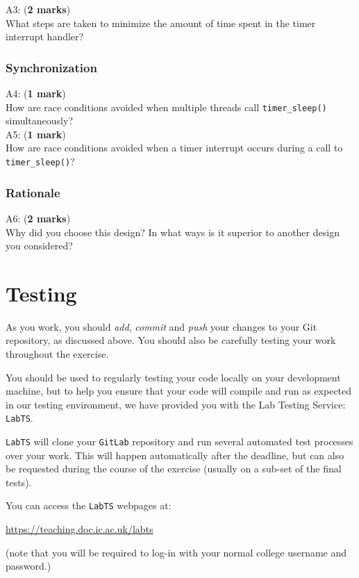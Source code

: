 \documentclass[a4paper,12pt]{article}
\newcommand{\shell}[1]{\lstinline!#1!}
\begin{document}
\noindent A3: ({\bf 2 marks}) \\
What steps are taken to minimize the amount of time spent in the timer interrupt handler?

\subsubsection*{Synchronization}
A4: ({\bf 1 mark}) \\
How are race conditions avoided when multiple threads call \shell{timer_sleep()} simultaneously? \\ 

\noindent A5: ({\bf 1 mark}) \\
How are race conditions avoided when a timer interrupt occurs during a call to \shell{timer_sleep()}?

\subsubsection*{Rationale}
A6: ({\bf 2 marks}) \\
Why did you choose this design?  
In what ways is it superior to another design you considered?

\section*{Testing}
As you work, you should \emph{add}, \emph{commit} and \emph{push} your changes to your Git repository, as discussed above.
You should also be carefully testing your work throughout the exercise. 

You should be used to regularly testing your code locally on your development machine, 
but to help you ensure that your code will compile and run as expected in our testing environment,
we have provided you with the Lab Testing Service: \shell{LabTS}.

\shell{LabTS} will clone your \shell{GitLab} repository and run several automated test processes over your work.
This will happen automatically after the deadline, but can also be requested during the course of the exercise (usually on a sub-set of the final tests). 

You can access the \shell{LabTS} webpages at:

\url{https://teaching.doc.ic.ac.uk/labts}

\noindent (note that you will be required to log-in with your normal college username and password.)
\end{document}

